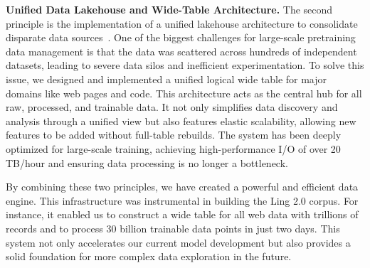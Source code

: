{\bfseries Unified Data Lakehouse and Wide-Table Architecture. }
The second principle is the implementation of a unified lakehouse architecture to consolidate disparate data sources~\citep{datainfra2}. One of the biggest challenges for large-scale pretraining data management is that the data was scattered across hundreds of independent datasets, leading to severe data silos and inefficient experimentation. To solve this issue, we designed and implemented a unified logical wide table for major domains like web pages and code. This architecture acts as the central hub for all raw, processed, and trainable data. It not only simplifies data discovery and analysis through a unified view but also features elastic scalability, allowing new features to be added without full-table rebuilds. The system has been deeply optimized for large-scale training, achieving high-performance I/O of over 20 TB/hour and ensuring data processing is no longer a bottleneck.

By combining these two principles, we have created a powerful and efficient data engine. This infrastructure was instrumental in building the Ling 2.0 corpus. For instance, it enabled us to construct a wide table for all web data with trillions of records and to process 30 billion trainable data points in just two days. This system not only accelerates our current model development but also provides a solid foundation for more complex data exploration in the future.
